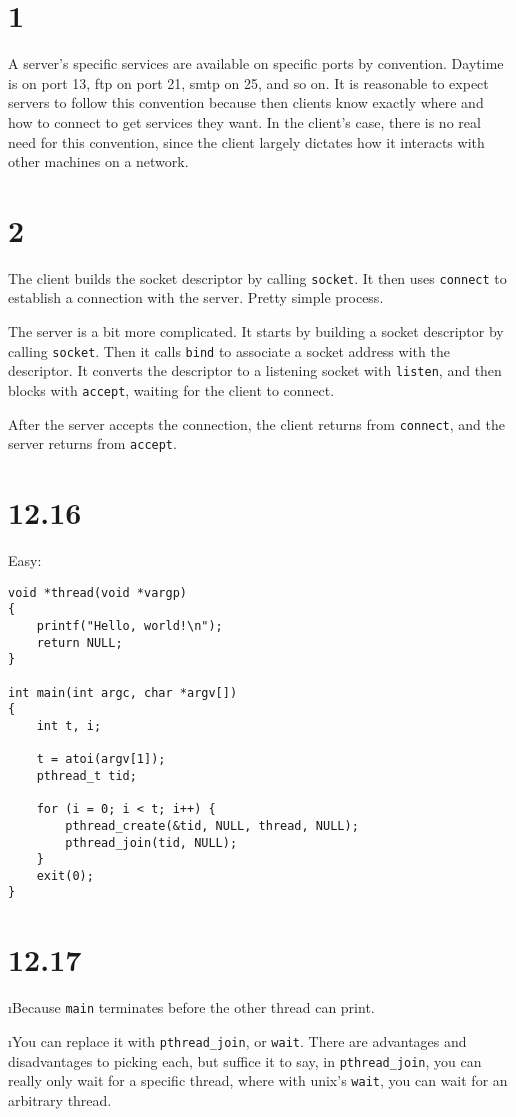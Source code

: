 \documentclass[fleqn]{article}
\begin{document}


\section*{1}

A server's specific services are available on specific ports by convention. Daytime is on port 13, ftp on port 21, smtp on 25, and so on. It is reasonable to expect servers to follow this convention because then clients know exactly where and how to connect to get services they want. In the client's case, there is no real need for this convention, since the client largely dictates how it interacts with other machines on a network.

\section*{2}

The client builds the socket descriptor by calling \texttt{socket}. It then uses \texttt{connect} to establish a connection with the server. Pretty simple process.

The server is a bit more complicated. It starts by building a socket descriptor by calling \texttt{socket}. Then it calls \texttt{bind} to associate a socket address with the descriptor. It converts the descriptor to a listening socket with \texttt{listen}, and then blocks with \texttt{accept}, waiting for the client to connect.

After the server accepts the connection, the client returns from \texttt{connect}, and the server returns from \texttt{accept}.

\section*{12.16}

Easy:

\begin{verbatim}
void *thread(void *vargp)
{
    printf("Hello, world!\n");
    return NULL;
}

int main(int argc, char *argv[])
{
    int t, i;

    t = atoi(argv[1]);
    pthread_t tid;

    for (i = 0; i < t; i++) {
        pthread_create(&tid, NULL, thread, NULL);
        pthread_join(tid, NULL);
	}
    exit(0);
}
\end{verbatim}

\section*{12.17}

\bee

\i Because \texttt{main} terminates before the other thread can print.

\i You can replace it with \texttt{pthread\_join}, or \texttt{wait}. There are advantages and disadvantages to picking each, but suffice it to say, in \texttt{pthread\_join}, you can really only wait for a specific thread, where with unix's \texttt{wait}, you can wait for an arbitrary thread.

\ene
\end{document}
